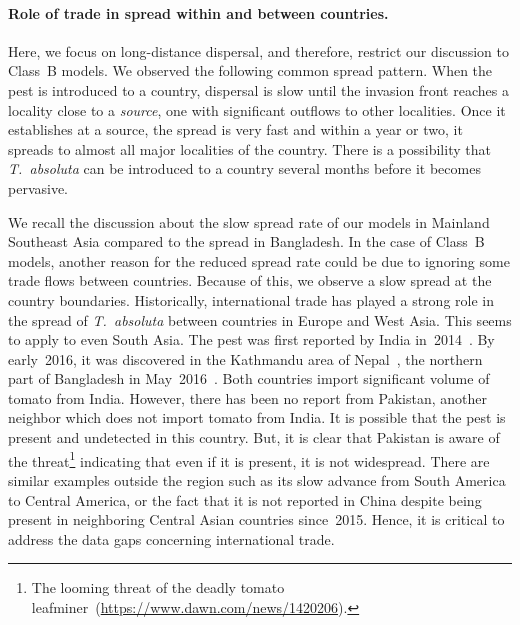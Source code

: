 \documentclass[11pt]{article}
\newcommand{\tuta}{\emph{T.~absoluta}}
\theoremstyle{definition}
\begin{document}
\paragraph{Role of trade in spread within and between countries.}
Here, we focus on long-distance dispersal, and therefore, restrict our
discussion to Class~B models. We observed the following common spread
pattern.  When the pest is introduced to a country, dispersal is slow until
the invasion front reaches a locality close to a \emph{source}, one with
significant outflows to other localities. Once it establishes at a source,
the spread is very fast and within a year or two, it spreads to almost all
major localities of the country. There is a possibility that \tuta{} can be
introduced to a country several months before it becomes pervasive. 

We recall the discussion about the slow spread rate of our models in
Mainland Southeast Asia compared to the spread in Bangladesh. In the case
of Class~B models, another
reason for the reduced spread rate could be due to ignoring some trade
flows between countries. Because of
this, we observe a slow spread at the country boundaries.
Historically, international trade has played a strong role in the spread of
\tuta{} between countries in Europe
and West Asia.  This seems to apply to even South Asia. The pest was first
reported by India
in~2014~\cite{sridhar2014new,kalleshwaraswamy2015occurrence}. By
early~2016, it was discovered in the Kathmandu area of
Nepal~\cite{bajracharya2016first}, the northern part of Bangladesh in
May~2016~\cite{hossain2016first}. Both countries import significant volume
of tomato from India. However, there has been no report from Pakistan,
another neighbor which does not import tomato from India. It is possible
that the pest is present and undetected in this country. But, it is clear
that Pakistan is aware of the threat\footnote{The looming threat of the
deadly tomato leafminer~(\url{https://www.dawn.com/news/1420206}).} indicating that even
if it is present, it is not widespread. There are similar examples outside the
region such as its slow advance from South America to Central America, or
the fact that it is not reported in China despite being present in
neighboring Central Asian countries since~2015. Hence, it is critical to
address the data gaps concerning international trade.
\end{document}
